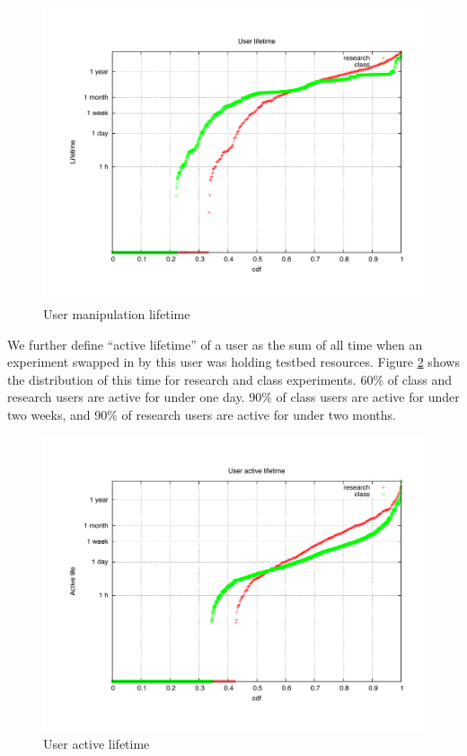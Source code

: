 \documentclass[10pt]{article}
\begin{document}
\begin{figure}[htbp]
\begin{center}
\includegraphics[width=5in]{figs/ulife.pdf}
\caption{User manipulation lifetime}
\label{ulife}
\end{center}
\end{figure}

We further define ``active lifetime'' of a user as the sum of all time when an experiment swapped in by this user was holding testbed resources. Figure \ref{uactive} shows the distribution of this time for research and class experiments. 60\% of class and research users are active for under one day. 90\% of class users are active for under two weeks, and 90\% of research users are active for under two months.

\begin{figure}[htbp]
\begin{center}
\includegraphics[width=5in]{figs/uactive.pdf}
\caption{User active lifetime}
\label{uactive}
\end{center}
\end{figure}
\end{document}
